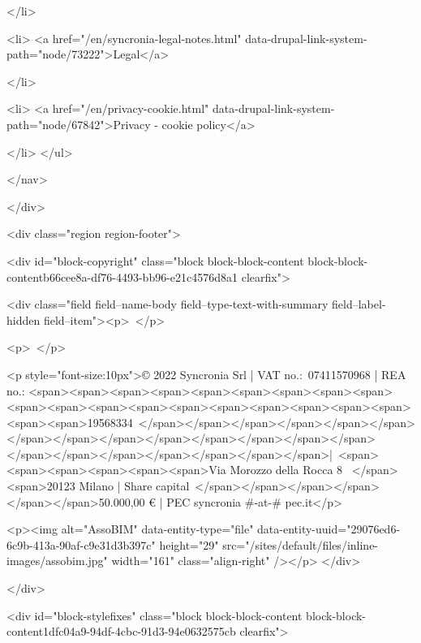             </li>
        
                   
            
      
            
    

                    <li>
                  <a href="/en/syncronia-legal-notes.html" data-drupal-link-system-path="node/73222">Legal</a>
                    
            </li>
        
                   
            
      
            
    

                    <li>
                  <a href="/en/privacy-cookie.html" data-drupal-link-system-path="node/67842">Privacy - cookie policy</a>
                    
            </li>
        </ul>
  

  </nav>

  </div>

          <div class="region region-footer">
    
<div id="block-copyright" class="block block-block-content block-block-contentb66cee8a-df76-4493-bb96-e21c4576d8a1 clearfix">
  
    

      
            <div class="field field--name-body field--type-text-with-summary field--label-hidden field--item"><p> </p>

<p> </p>

<p style="font-size:10px">© 2022 Syncronia Srl | VAT no.: 07411570968 | REA no.: <span><span><span><span><span><span><span><span><span><span><span><span><span><span><span><span><span><span><span><span><span>19568334 </span></span></span></span></span></span></span></span></span></span></span></span></span></span></span></span></span></span></span></span></span>| <span><span><span><span><span><span>Via Morozzo della Rocca 8  </span><span>20123 Milano | Share capital </span></span></span></span></span></span>50.000,00 € | PEC syncronia #-at-# pec.it</p>

<p><img alt="AssoBIM" data-entity-type="file" data-entity-uuid="29076ed6-6c9b-413a-90af-c9e31d3b397c" height="29" src="/sites/default/files/inline-images/assobim.jpg" width="161" class="align-right" /></p>
</div>
      
  </div>


<div id="block-stylefixes" class="block block-block-content block-block-content1dfc04a9-94df-4cbc-91d3-94e0632575cb clearfix">
  
